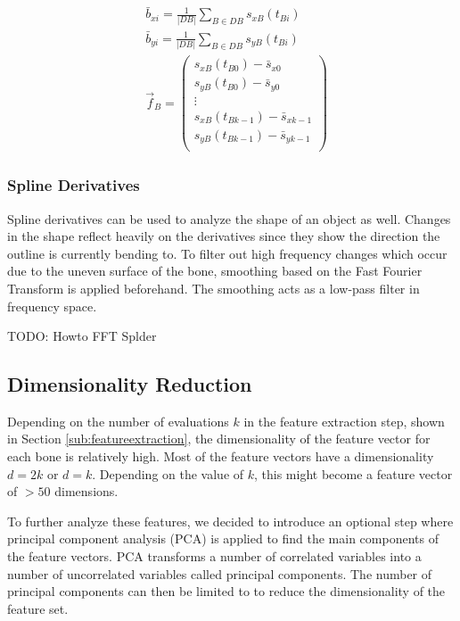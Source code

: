 \documentclass[pdftex,12pt,a4paper]{report}
\begin{document}
\begin{equation}
\begin{split}
& \bar{b}_{xi} = \frac{1}{|DB|} \sum_{B \in DB} s_{xB}(t_{Bi}) \\
& \bar{b}_{yi} = \frac{1}{|DB|} \sum_{B \in DB} s_{yB}(t_{Bi}) \\
& \vec{f}_B = \left( \begin{array}{c}
s_{xB}(t_{B0}) - \bar{s}_{x0} \\
s_{yB}(t_{B0}) - \bar{s}_{y0} \\
\vdots \\
s_{xB}(t_{Bk-1}) - \bar{s}_{xk-1} \\
s_{yB}(t_{Bk-1}) - \bar{s}_{yk-1} \\
\end{array} \right)  
\end{split}
\end{equation}

\subsubsection{Spline Derivatives}

Spline derivatives can be used to analyze the shape of an object as well. Changes in the shape reflect heavily
on the derivatives since they show the direction the outline is currently bending to. To filter out high frequency
changes which occur due to the uneven surface of the bone, smoothing based on the Fast Fourier Transform is applied
beforehand. The smoothing acts as a low-pass filter in frequency space.

TODO: Howto FFT Splder

\subsection{Dimensionality Reduction}

Depending on the number of evaluations $k$ in the feature extraction step, shown in Section
\ref{sub:featureextraction}, the dimensionality of the feature vector for each bone is relatively high. Most of 
the feature vectors have a dimensionality $d = 2k$ or $d = k$. Depending on the value of $k$, this might become
a feature vector of $> 50$ dimensions.

To further analyze these features, we decided to introduce an optional step where principal component analysis
(PCA) is applied to find the main components of the feature vectors. PCA transforms a number of correlated variables into a number of uncorrelated variables called principal components. The number of principal components can then be limited to to reduce the dimensionality of the feature set.
\end{document}
